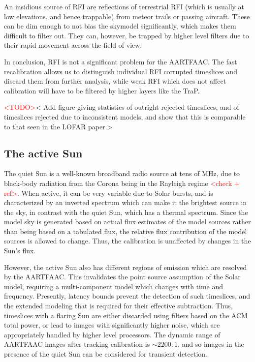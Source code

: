 \documentclass{aa}
\begin{document}
An insidious source of RFI are reflections of terrestrial RFI (which
is usually at low elevations, and hence trappable) from meteor trails
or passing aircraft. These can be dim enough to not bias the skymodel
significantly, which makes them difficult to filter out. They can,
however, be trapped by higher level filters due to their rapid movement
across the field of view.

In conclusion, RFI is not a significant problem for the AARTFAAC.
The fast recalibration allows us to distinguish individual RFI corrupted
timeslices and discard them from further analysis, while weak RFI
which does not affect calibration will have to be filtered by higher
layers like the TraP.

\textcolor{red}{<TODO>}< Add figure giving statistics of outright
rejected timeslices, and of timeslices rejected due to inconsistent
models, and show that this is comparable to that seen in the LOFAR
paper.>


\subsection{The active Sun}

The quiet Sun is a well-known broadband radio source at tens of MHz,
due to black-body radiation from the Corona being in the Rayleigh
regime \textcolor{red}{<check + ref>}. When active, it can be very
variable due to Solar bursts, and is characterized by an inverted
spectrum which can make it the brightest source in the sky, in contrast
with the quiet Sun, which has a thermal spectrum. Since the model
sky is generated based on actual flux estimates of the model sources
rather than being based on a tabulated flux, the relative flux contribution
of the model sources is allowed to change. Thus, the calibration is
unaffected by changes in the Sun's flux.

However, the active Sun also has different regions of emission which
are resolved by the AARTFAAC. This invalidates the point source assumption
of the Solar model, requiring a multi-component model which changes
with time and frequency. Presently, latency bounds prevent the detection
of such timeslices, and the extended modeling that is required for
their effective subtraction. Thus, timeslices with a flaring Sun are
either discarded using filters based on the ACM total power, or lead
to images with significantly higher noise, which are appropriately
handled by higher level processors. The dynamic range of AARTFAAC
images after tracking calibration is $\sim2200:1$, and so images
in the presence of the quiet Sun can be considered for transient detection. 
\end{document}
